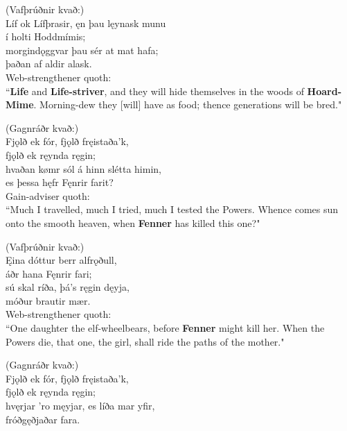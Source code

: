 (Vafþrúðnir kvað:) \\%
\bva Líf ok Lífþrasir, \hld ęn þau lęynask munu \\%
í holti Hoddmímis; \\%
morgindǫggvar \hld þau sér at mat hafa; \\%
þaðan af aldir alask.\\%

\bvb Web-strengthener quoth: \\ “\textbf{Life} and \textbf{Life-striver}, and they will hide themselves in the woods of \textbf{Hoard-Mime}\footnotemark[85]. Morning-dew they [will] have as food; thence generations will be bred." \\

(Gagnráðr kvað:) \\%
\bva Fjǫlð ek fór, \hld fjǫlð fręistaða'k, \\%
fjǫlð ek ręynda ręgin; \\%
hvaðan kømr sól \hld á hinn slétta himin, \\%
es þessa hęfr Fęnrir farit?\\%

\bvb Gain-adviser quoth: \\ “Much I travelled, much I tried, much I tested the Powers. Whence comes sun onto the smooth heaven, when \textbf{Fenner} has killed this one\footnotemark[90]?" \\

(Vafþrúðnir kvað:) \\%
\bva Ęina dóttur \hld berr alfrǫðull, \\%
áðr hana Fęnrir fari; \\%
sú skal ríða, \hld þá's ręgin dęyja, \\%
móður brautir mær.\\%

\bvb Web-strengthener quoth: \\ “One daughter the elf-wheel\footnotemark[95] bears, before \textbf{Fenner} might kill her. When the Powers die, that one, the girl, shall ride the paths of the mother." \\

(Gagnráðr kvað:) \\%
\bva Fjǫlð ek fór, \hld fjǫlð fręistaða'k, \\%
fjǫlð ek ręynda ręgin; \\%
hvęrjar 'ro męyjar, \hld es líða mar yfir, \\%
fróðgęðjaðar fara.\\%

